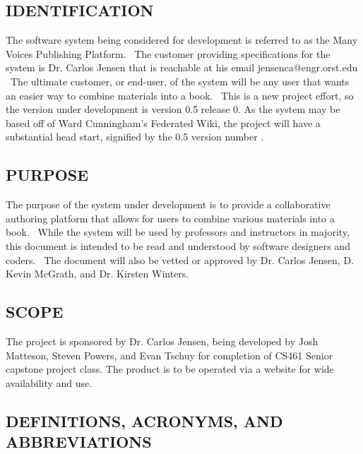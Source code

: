 \documentclass[letterpaper, 10pt, draftclsnofoot, compsoc, onecolumn]{IEEEtran}
\begin{document}
\subsection[IDENTIFICATION]{\rmfamily\bfseries\color{black} IDENTIFICATION}


{\noindent
The software system being considered for development is referred to as the Many Voices
Publishing Platform. \ The customer providing specifications
for the system is Dr. Carlos Jensen that is reachable at his email jensenca@engr.orst.edu \
The ultimate customer, or end-user, of the system will be any user that wants an easier
way to combine materials into a book. \ This is a new project effort, so the
version under development is version 0.5 release 0. As the system may be based off of Ward Cunningham's 
Federated Wiki, the project will have a substantial head start, signified by the 0.5 version number \cite{Federated}.}

\subsection[PURPOSE]{\rmfamily\bfseries\color{black} PURPOSE}

{\noindent 
The purpose of the system under
development is to provide a collaborative authoring platform that allows for users to
combine various materials into a book. \ While the system will be used by professors and
instructors in majority, this document is intended to be read and understood by software
designers and coders. \ The document will also be vetted or
approved by Dr. Carlos Jensen, D. Kevin McGrath, and Dr. Kirsten Winters.}

\subsection[SCOPE]{\rmfamily\bfseries\color{black} SCOPE}

{\noindent 
The project is sponsored by Dr. Carlos Jensen, being developed by Josh Matteson,
Steven Powers, and Evan Tschuy for completion of CS461 Senior capstone project class.
The product is to be operated via a website for wide availability and use.}

\subsection[DEFINITIONS, ACRONYMS, AND ABBREVIATIONS]{\rmfamily\bfseries\color{black} DEFINITIONS, ACRONYMS, AND ABBREVIATIONS}

\bigskip
\end{document}
